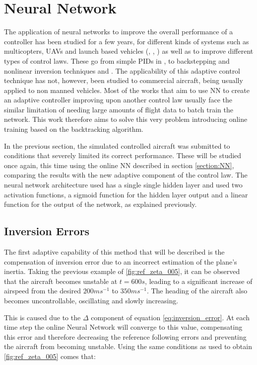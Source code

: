\section{Neural Network}
\label{section:results/NN}

The application of neural networks to improve the overall performance of a controller has been studied for a few years, for different kinds of systems such as multicopters, UAVs and launch based vehicles (\cite{quad_NLI+NN}, \cite{YANG+LIN_Adaptive_Flight_Control}, \cite{NN_PID2}) as well as to improve different types of control laws. These go from simple PIDs in \cite{NN_PID}, \cite{NN_PID2} to  backstepping and nonlinear inversion techniques \cite{NN_backlash} and \citep{NN_NLI}. The applicability of this adaptive control technique has not, however, been studied to commercial aircraft, being usually applied to non manned vehicles. Most of the works that aim to use NN to create an adaptive controller improving upon another control law usually face the similar limitation of needing large amounts of flight data to batch train the network. This work therefore aims to solve this very problem introducing online training based on the backtracking algorithm. 

In the previous section, the simulated controlled aircraft was submitted to conditions that severely limited its correct performance. These will be studied once again, this time using the online NN described in section \ref{section:NN}, comparing the results with the new adaptive component of the control law. The neural network architecture used has a single single hidden layer and used two activation functions, a sigmoid function for the hidden layer output and a linear function for the output of the network, as explained previously. 


\subsection{Inversion Errors}

The first adaptive capability of this method that will be described is the compensation of inversion error due to an incorrect estimation of the plane's inertia. Taking the previous example of \ref{fig:ref_zeta_005}, it can be observed that the aircraft becomes unstable at $t=600s$, leading to a significant increase of airspeed from the desired $200ms^{-1}$ to $350ms^{-1}$. The heading of the aircraft also becomes uncontrollable, oscillating and slowly increasing. 

This is caused due to the $\Delta$ component of equation \ref{eq:inversion_error}. At each time step the online Neural Network will converge to this value, compensating this error and therefore decreasing the reference following errors and preventing the aircraft from becoming unstable. Using the same conditions as used to obtain \ref{fig:ref_zeta_005} comes that:

